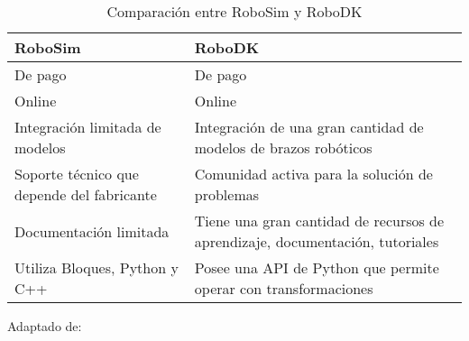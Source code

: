 \begin{table}[h!]
    \centering
    \renewcommand{\arraystretch}{0.9} %
    \normalsize %
    \begin{tabular}{|l|p{6cm}|} %
    \hline
    \textbf{RoboSim} & \textbf{RoboDK} \\ \hline
    De pago & De pago \\ \hline
    Online & Online \\ \hline
    Integración limitada de modelos & Integración de una gran cantidad de modelos de brazos robóticos \\ \hline
    Soporte técnico que depende del fabricante  & Comunidad activa para la solución de problemas \\ \hline
    Documentación limitada & Tiene una gran cantidad de recursos de aprendizaje, documentación, tutoriales \\ \hline
    Utiliza Bloques, Python y C++ & Posee una API de Python que permite operar con transformaciones \\ \hline
    \end{tabular}
    \caption{Comparación entre RoboSim y RoboDK}{Adaptado de: \cite{simulador}}
\end{table}
    